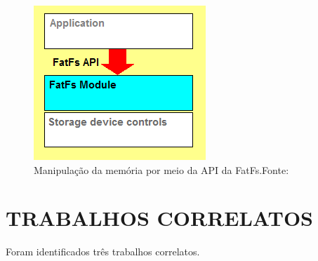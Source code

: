 \begin{figure}[H]
    \scriptsize
     \centering
     \includegraphics[scale=0.6]{dados/figuras/fatfs2.png}
     \caption{Manipulação da memória por meio da API da FatFs.\newline  Fonte:\cite{FATFS}}
     \label{FatFS2}
\end{figure}



\section{TRABALHOS CORRELATOS}

Foram identificados três trabalhos correlatos.


